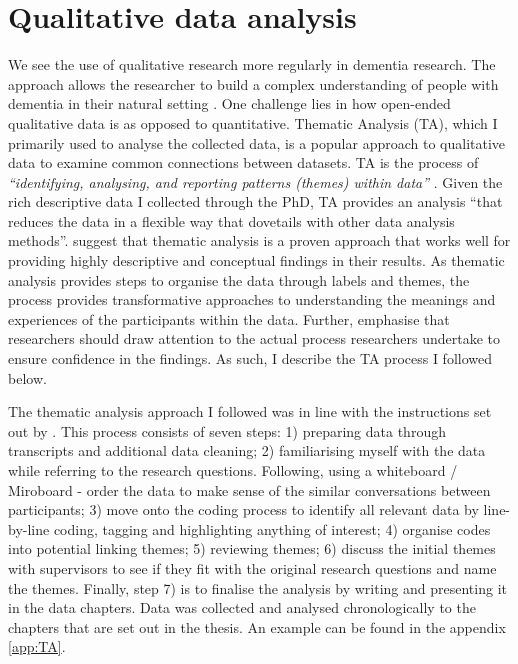 \section{Qualitative data analysis}
\label{QualDataAnalysis}
We see the use of qualitative research more regularly in dementia research. The approach allows the researcher to build a complex understanding of people with dementia in their natural setting \citep{mckeown_actively_2009}. One challenge lies in how open-ended qualitative data is as opposed to quantitative. Thematic Analysis (TA), which I primarily used to analyse the collected data, is a popular approach to qualitative data to examine common connections between datasets. TA is the process of \textit{``identifying, analysing, and reporting patterns (themes) within data''} \citep{braun_using_2006}. Given the rich descriptive data I collected through the PhD, TA provides an analysis ``that reduces the data in a flexible way that dovetails with other data analysis methods''. \citep{kiger2020thematic} suggest that thematic analysis is a proven approach that works well for providing highly descriptive and conceptual findings in their results. As thematic analysis provides steps to organise the data through labels and themes, the process provides transformative approaches to understanding the meanings and experiences of the participants within the data. Further, \cite{braun2012thematic} emphasise that researchers should draw attention to the actual process researchers undertake to ensure confidence in the findings. As such, I describe the TA process I followed below.

The thematic analysis approach I followed was in line with the instructions set out by \cite{braun_one_2020}. This process consists of seven steps: 1) preparing data through transcripts and additional data cleaning; 2) familiarising myself with the data while referring to the research questions. Following, using a whiteboard / Miroboard - order the data to make sense of the similar conversations between participants; 3) move onto the coding process to identify all relevant data by line-by-line coding, tagging and highlighting anything of interest; 4) organise codes into potential linking themes; 5) reviewing themes; 6) discuss the initial themes with supervisors to see if they fit with the original research questions and name the themes. Finally, step 7) is to finalise the analysis by writing and presenting it in the data chapters. Data was collected and analysed chronologically to the chapters that are set out in the thesis. An example can be found in the appendix \ref{app:TA}.

